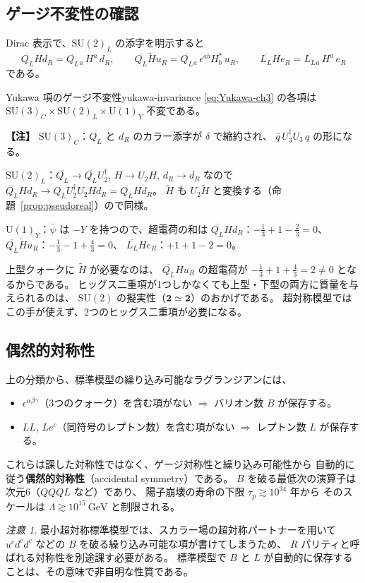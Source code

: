 \documentclass[uplatex,dvipdfmx,a4paper,11pt,openany]{jsbook}
\newcommand{\term}[2]{\textbf{#1}（#2）}
\newenvironment{note}{\vspace{1ex}\par\footnotesize\noindent\textbf{【注】}}{\par\vspace{1ex}}
\numberwithin{equation}{chapter}
\theoremstyle{definition}
\theoremstyle{plain}
\theoremstyle{remark}
\newtheorem{remark}{注意}[chapter]
\newcommand{\SU}{\mathrm{SU}}
\newcommand{\U}{\mathrm{U}}
\begin{document}
\subsection{ゲージ不変性の確認}
Dirac 表示で、$\SU(2)_L$ の添字を明示すると
\begin{equation}
\overline{Q_L}Hd_R=\overline{Q_L}{}_a\,H^a\,d_R,
\qquad
\overline{Q_L}\tilde Hu_R=\overline{Q_L}{}_a\,\epsilon^{ab}H^*_b\,u_R,
\qquad
\overline{L_L}He_R=\overline{L_L}{}_a\,H^a\,e_R
\end{equation}
である。
\begin{myprop}{Yukawa 項のゲージ不変性}{yukawa-invariance}
\eqref{eq:Yukawa-ch3} の各項は $\SU(3)_C\times\SU(2)_L\times\U(1)_Y$ 不変である。
\end{myprop}
\begin{note}
\textbf{$\SU(3)_C$}：$\overline{Q_L}$ と $d_R$ のカラー添字が $\delta$ で縮約され、
$\bar q\,U_3^\dagger U_3\,q$ の形になる。

\textbf{$\SU(2)_L$}：$\overline{Q_L}\to\overline{Q_L}U_2^\dagger$, $H\to U_2H$, $d_R\to d_R$ なので
$\overline{Q_L}Hd_R\to\overline{Q_L}U_2^\dagger U_2Hd_R=\overline{Q_L}Hd_R$。
$\tilde H$ も $U_2\tilde H$ と変換する（命題~\ref{prop:pseudoreal}）ので同様。

\textbf{$\U(1)_Y$}：$\bar\psi$ は $-Y$ を持つので、超電荷の和は
$\overline{Q_L}Hd_R$：$-\frac13+1-\frac23=0$、
$\overline{Q_L}\tilde Hu_R$：$-\frac13-1+\frac43=0$、
$\overline{L_L}He_R$：$+1+1-2=0$。
\end{note}
上型クォークに $\tilde H$ が必要なのは、
$\overline{Q_L}Hu_R$ の超電荷が $-\frac13+1+\frac43=2\ne0$ となるからである。
ヒッグス二重項が1つしかなくても上型・下型の両方に質量を与えられるのは、
$\SU(2)$ の擬実性（$\mathbf2\simeq\bar{\mathbf2}$）のおかげである。
超対称模型ではこの手が使えず、2つのヒッグス二重項が必要になる。
\subsection{偶然的対称性}
上の分類から、標準模型の繰り込み可能なラグランジアンには、
\begin{itemize}
    \item $\epsilon^{\alpha\beta\gamma}$（3つのクォーク）を含む項がない
    $\Rightarrow$ バリオン数 $B$ が保存する。
    \item $LL$, $Le^c$（同符号のレプトン数）を含む項がない
    $\Rightarrow$ レプトン数 $L$ が保存する。
\end{itemize}
これらは課した対称性ではなく、ゲージ対称性と繰り込み可能性から
自動的に従う\term{偶然的対称性}{accidental symmetry}である。
$B$ を破る最低次の演算子は次元6（$QQQL$ など）であり、
陽子崩壊の寿命の下限 $\tau_p\gtrsim10^{34}$ 年から
そのスケールは $\Lambda\gtrsim10^{15}\ \mathrm{GeV}$ と制限される。
\begin{remark}
最小超対称標準模型では、スカラー場の超対称パートナーを用いて
$u^cd^cd^c$ などの $B$ を破る繰り込み可能な項が書けてしまうため、
$R$ パリティと呼ばれる対称性を別途課す必要がある。
標準模型で $B$ と $L$ が自動的に保存することは、その意味で非自明な性質である。
\end{remark}
\end{document}
